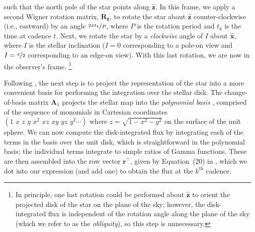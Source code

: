 \documentclass[modern]{aastex62}
\begin{document}
such that the north pole of the star points along $\hat{\mathbf{z}}$. In this
frame, we apply a second Wigner rotation matrix, $\mathbf{R}_{\hat{\mathbf{z}}}$,
to rotate the star about $\hat{\mathbf{z}}$ counter-clockwise (i.e., eastward) by an angle
$\nicefrac{2\pi t_k}{P}$, where $P$ is the rotation period and $t_k$ is the
time at cadence $t$.
Next, we rotate the star by a \emph{clockwise} angle of $I$ about $\hat{\mathbf{x}}$,
where $I$ is the stellar inclination ($I = 0$ corresponding to a pole-on view and
$I = \nicefrac{\pi}{2}$ corresponding to an edge-on view). With this last rotation,
we are now in the observer's frame.%
\footnote{In principle, one last rotation could be performed about $\hat{\mathbf{z}}$
    to orient the projected disk of the star on the plane of the sky; however, the disk-integrated
    flux is independent of the rotation angle along the plane of the sky
    (which we refer to as the \emph{obliquity}), so this step is unnecessary.}

Following \citet{Luger2019}, the next step is to project the representation of
the star into a more convenient basis for performing the integration over the stellar
disk. The change-of-basis matrix $\mathbf{A}_1$ \citep[c.f. Appendix~B in][]{Luger2019}
projects the stellar map into the \emph{polynomial basis}
\citep[Equation~7 in][]{Luger2019}, comprised of the sequence of monomials in Cartesian
coordinates
$\left( 1 \,\, x \,\, z \,\, y \,\, x^2 \,\, xz \,\, xy \,\, yz \,\, y^2 \cdots \right)$
where $z = \sqrt{1 - x^2 - y^2}$ on the surface of the unit sphere. We
can now compute the disk-integrated flux by integrating each of the terms in the basis
over the unit disk, which is straightforward in the polynomial basis; the
individual terms integrate to simple ratios of Gamma functions. These are then
assembled into the row vector $\mathbf{r}^\top$, given by Equation~(20) in
\citet{Luger2019}, which we dot into our expression (and add one) to obtain the
flux at the $k^\mathrm{th}$ cadence.
\end{document}
